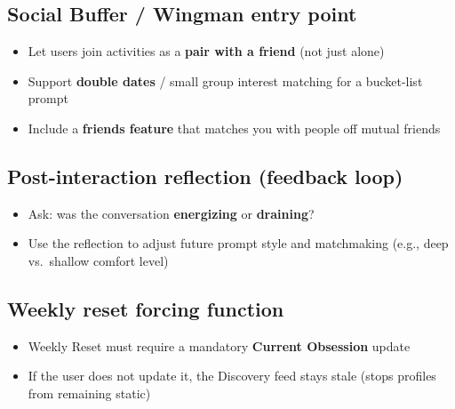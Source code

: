\documentclass[10pt,a4paper]{article}
\begin{document}
\subsection*{\color{eublue}Social Buffer / Wingman entry point}
\begin{itemize}
\item Let users join activities as a \textbf{pair with a friend} (not just alone)
\item Support \textbf{double dates} / small group interest matching for a bucket-list prompt
\item Include a \textbf{friends feature} that matches you with people off mutual friends
\end{itemize}

\subsection*{\color{eublue}Post-interaction reflection (feedback loop)}
\begin{itemize}
\item Ask: was the conversation \textbf{energizing} or \textbf{draining}?
\item Use the reflection to adjust future prompt style and matchmaking (e.g., deep vs.\ shallow comfort level)
\end{itemize}

\subsection*{\color{eublue}Weekly reset forcing function}
\begin{itemize}
\item Weekly Reset must require a mandatory \textbf{Current Obsession} update
\item If the user does not update it, the Discovery feed stays stale (stops profiles from remaining static)
\end{itemize}
\end{document}
